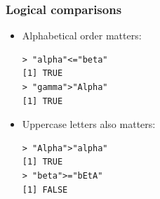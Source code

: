 \documentclass[xcolor=dvipsnames, xcolor=table]{beamer} %
\theoremstyle{mystyle}
\begin{document}
\begin{frame}[fragile] %
\frametitle{Logical comparisons}

\begin{itemize}

\item Alphabetical order matters:

\begin{verbatim}
> "alpha"<="beta"
[1] TRUE
> "gamma">"Alpha"
[1] TRUE
\end{verbatim}

\item Uppercase letters also matters:
\begin{verbatim}
> "Alpha">"alpha"
[1] TRUE
> "beta">="bEtA"
[1] FALSE
\end{verbatim}

\end{itemize}


\end{frame}


%
%
%
%
%
%
%
%
%
%
\end{document}
